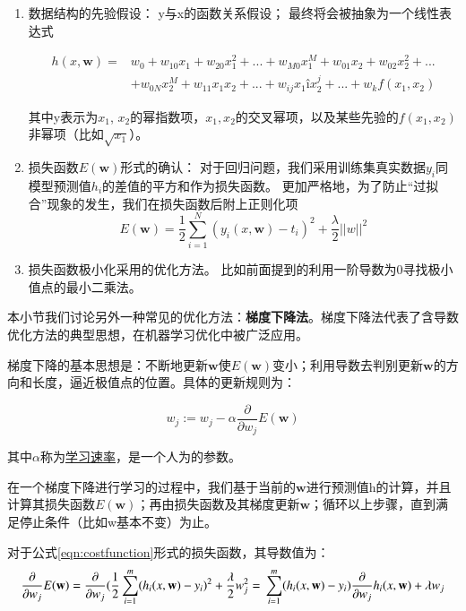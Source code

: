 \begin{enumerate}
\item 数据结构的先验假设： y与x的函数关系假设； 最终将会被抽象为一个线性表达式

\begin{equation}
\begin{aligned}
h(x,\mathbf{w}) = & w_0 + w_{10} x_1 + w_{20} x_1^2 + ... + w_{M0} x_1^M + w_{01} x_2 + w_{02} x_2^2 + ... \\
& + w_{0N} x_2^M + w_{11} x_1 x_2 + ...+ w_{ij} x_1î x_2^j + ... + w_{k} f(x_1, x_2)
\end{aligned}
\end{equation}

其中y表示为$x_1$, $x_2$的幂指数项，$x_1, x_2$的交叉幂项，以及某些先验的$f(x_1, x_2)$非幂项（比如$\sqrt{x_1}$）。

\item 损失函数$E(\mathbf{w})$形式的确认： 对于回归问题，我们采用训练集真实数据$y_i$同模型预测值$h_i$的差值的平方和作为损失函数。 更加严格地，为了防止“过拟合”现象的发生，我们在损失函数后附上正则化项
\begin{equation}
\label{eqn:costfunction}
E(\mathbf{w}) = \dfrac{1}{2} \sum^N_{i=1} (y_i(x, \mathbf{w}) - t_i )^2 + \dfrac{\lambda}{2} ||w||^2
\end{equation}

\item 损失函数极小化采用的优化方法。 比如前面提到的利用一阶导数为0寻找极小值点的最小二乘法。
\end{enumerate}

本小节我们讨论另外一种常见的优化方法：\textbf{梯度下降法}。梯度下降法代表了含导数优化方法的典型思想，在机器学习优化中被广泛应用。

梯度下降的基本思想是：不断地更新$\mathbf{w}$使$E(\mathbf{w})$变小；利用导数去判别更新$\mathbf{w}$的方向和长度，逼近极值点的位置。具体的更新规则为：

\begin{equation}
w_j := w_j -\alpha \dfrac{\partial}{\partial w_j} E(\mathbf{w})
\end{equation}

其中$\alpha$称为\uline{学习速率}，是一个人为的参数。

在一个梯度下降进行学习的过程中，我们基于当前的$\mathbf{w}$进行预测值h的计算，并且计算其损失函数$E(\mathbf{w})$；再由损失函数及其梯度更新$\mathbf{w}$；循环以上步骤，直到满足停止条件（比如w基本不变）为止。


对于公式\ref{eqn:costfunction}形式的损失函数，其导数值为：
\begin{equation}
\dfrac{\partial}{\partial w_j} E(\mathbf{w}) = \dfrac{\partial}{\partial w_j} (\dfrac{1}{2} \sum^m_{i=1} (h_i(x, \mathbf{w}) - y_i )^2 + \dfrac{\lambda}{2} w_j^2 =\\
 \sum^m_{i=1} (h_i(x, \mathbf{w}) - y_i ) \dfrac{\partial}{\partial w_j} h_i(x, \mathbf{w}) + \lambda w_j
\end{equation}

